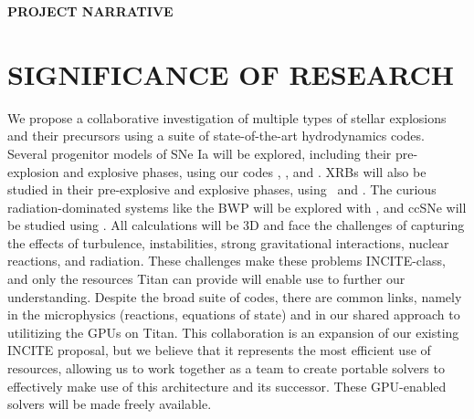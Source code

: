 \documentclass[11pt,letterpaper,english]{article}
\begin{document}
\pagestyle{fancy} 
 \renewcommand{%
\headrulewidth}{0.0pt}

\begin{center}
{\bf PROJECT NARRATIVE}
\end{center}


\section{SIGNIFICANCE OF RESEARCH}


We propose a collaborative investigation of multiple types of stellar
explosions and their precursors using a suite of state-of-the-art
hydrodynamics codes.  Several progenitor models of SNe Ia will be
explored, including their pre-explosion and explosive phases, using
our codes \maestro, \castro, and \flash.  XRBs will also be studied in
their pre-explosive and explosive phases, using \maestro\ and \castro.
The curious radiation-dominated systems like the BWP will be explored
with \castro, and ccSNe will be studied using \chimera.  All
calculations will be 3D and face the challenges of capturing the
effects of turbulence, instabilities, strong gravitational
interactions, nuclear reactions, and radiation.  These challenges make
these problems INCITE-class, and only the resources Titan can provide
will enable use to further our understanding.  Despite the broad suite
of codes, there are common links, namely in the microphysics
(reactions, equations of state) and in our shared approach to
utilitizing the GPUs on Titan.  This collaboration is an expansion of
our existing INCITE proposal, but we believe that it represents the
most efficient use of resources, allowing us to work together as a
team to create portable solvers to effectively make use of this
architecture and its successor.  These GPU-enabled solvers will be
made freely available.
\end{document}
